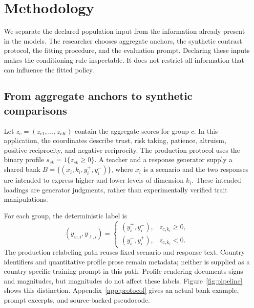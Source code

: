 \section{Methodology}\label{sec:methodology}
We separate the declared population input from the information already present in the models. The researcher chooses aggregate anchors, the synthetic contrast protocol, the fitting procedure, and the evaluation prompt. Declaring these inputs makes the conditioning rule inspectable. It does not restrict all information that can influence the fitted policy.

\subsection{From aggregate anchors to synthetic comparisons}
Let $z_c=(z_{c1},\ldots,z_{cK})$ contain the aggregate scores for group $c$. In this application, the coordinates describe trust, risk taking, patience, altruism, positive reciprocity, and negative reciprocity. The production protocol uses the binary profile $s_{ck}=1\{z_{ck}\geq0\}$. A teacher and a response generator supply a shared bank $B=\{(x_i,k_i,y_i^+,y_i^-)\}$, where $x_i$ is a scenario and the two responses are intended to express higher and lower levels of dimension $k_i$. These intended loadings are generator judgments, rather than experimentally verified trait manipulations.

For each group, the deterministic label is
\begin{equation}
(y_{w,i},y_{\ell,i})=\begin{cases}(y_i^+,y_i^-),&z_{c,k_i}\geq0,\\(y_i^-,y_i^+),&z_{c,k_i}<0.\end{cases}
\label{eq:sign_rule}
\end{equation}
The production relabeling path reuses fixed scenario and response text. Country identifiers and quantitative profile prose remain metadata; neither is supplied as a country-specific training prompt in this path. Profile rendering documents signs and magnitudes, but magnitudes do not affect these labels. Figure~\ref{fig:pipeline} shows this distinction. Appendix~\ref{app:protocol} gives an actual bank example, prompt excerpts, and source-backed pseudocode.

